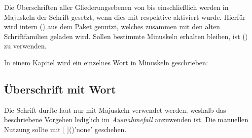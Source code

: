 %
Die Überschriften aller Gliederungsebenen von  bis einschließlich 
 werden in Majuskeln der Schrift \DIN gesetzt, wenn dies 
mit  respektive  aktiviert 
wurde. Hierfür wird intern () aus 
dem Paket  genutzt, welches zusammen mit den alten 
Schriftfamilien geladen wird. Sollen bestimmte Minuskeln erhalten bleiben, ist 
() zu verwenden.
%
\begin{Example}
In einem Kapitel wird ein einzelnes Wort in Minuskeln geschrieben:
\begin{Code}
\chapter{Überschrift mit  Wort}
\end{Code}
\end{Example}
%
Die Schrift \DIN durfte laut \CD nur mit Majuskeln verwendet werden, weshalb 
das beschriebene Vorgehen lediglich im \emph{Ausnahmefall} anzuwenden ist. 
Die manuellen Nutzung sollte mit 
[%
]()'none' geschehen.
